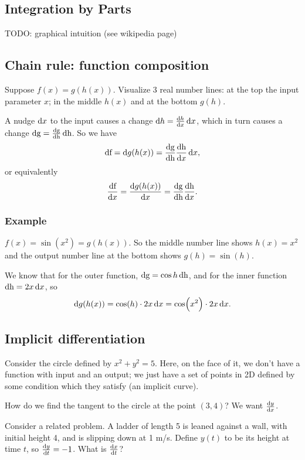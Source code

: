 \subsection{Integration by Parts}

TODO: graphical intuition (see wikipedia page)

\newpage
\subsection{Chain rule: function composition}
Suppose $f(x) = g(h(x))$. Visualize 3 real number lines: at the top the input
parameter $x$; in the middle $h(x)$ and at the bottom $g(h)$.

A nudge $\dx$ to the input causes a change $\d h = \frac{\d h}{\dx} \dx$, which in turn causes a
change $\operatorname{\text{dg}} = \frac{\operatorname{\text{dg}}}{\operatorname{\text{dh}}} \operatorname{\text{dh}}$. So we have
\begin{align*}
  \df = \d g(h(x)) = \frac{\dg}{\dh} \frac{\dh}{\dx} \dx,
\end{align*}
or equivalently
\begin{align*}
  \frac{\df}{\dx} = \frac{\d g(h(x))}{\dx} = \frac{\dg}{\dh} \frac{\dh}{\dx}.
\end{align*}

\subsubsection{Example}
$f(x) = \sin(x^2) = g(h(x))$. So the middle number line shows $h(x) = x^2$ and
the output number line at the bottom shows $g(h) = \sin(h)$.

We know that for the outer function, $\operatorname{\text{dg}} = \cos h \operatorname{\text{dh}}$, and for the inner
function $\dh = 2x \dx$, so
\begin{align*}
  \d g(h(x)) = \cos (h) \cdot 2x \dx = \cos(x^2)\cdot 2x \dx.
\end{align*}

\newpage
\subsection{Implicit differentiation}

Consider the circle defined by $x^2 + y^2 = 5$. Here, on the face of it, we
don't have a function with input and an output; we just have a set of points in
2D defined by some condition which they satisfy (an implicit curve).

How do we find the tangent to the circle at the point $(3,4)$? We want $\dydx$.

Consider a related problem. A ladder of length 5 is leaned against a wall, with
initial height 4, and is slipping down at 1 m/s. Define $y(t)$ to be its height
at time $t$, so $\dydt = -1$. What is $\dxdt$?

